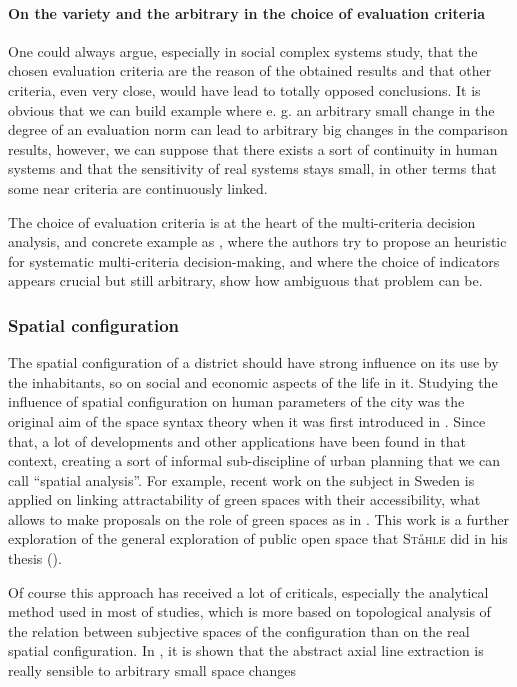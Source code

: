 \documentclass[english]{article}
\newcommand{\noun}[1]{\textsc{#1}}
\begin{document}
\paragraph{On the variety and the arbitrary in the choice of evaluation criteria}

One could always argue, especially in social complex systems study,
that the chosen evaluation criteria are the reason of the obtained
results and that other criteria, even very close, would have lead
to totally opposed conclusions. It is obvious that we can build example
where e. g. an arbitrary small change in the degree of an evaluation
norm can lead to arbitrary big changes in the comparison results,
however, we can suppose that there exists a sort of continuity in
human systems and that the sensitivity of real systems stays small,
in other terms that some near criteria are continuously linked.

\bigskip{}


The choice of evaluation criteria is at the heart of the multi-criteria
decision analysis, and concrete example as \cite{zietsman2006transportation},
where the authors try to propose an heuristic for systematic multi-criteria
decision-making, and where the choice of indicators appears crucial
but still arbitrary, show how ambiguous that problem can be.


\subsubsection{Spatial configuration}

The spatial configuration of a district should have strong influence
on its use by the inhabitants, so on social and economic aspects of
the life in it. Studying the influence of spatial configuration on
human parameters of the city was the original aim of the space syntax
theory when it was first introduced in \cite{hillier1976space}. Since
that, a lot of developments and other applications have been found
in that context, creating a sort of informal sub-discipline of urban
planning that we can call ``spatial analysis''. For example, recent
work on the subject in Sweden is applied on linking attractability
of green spaces with their accessibility, what allows to make proposals
on the role of green spaces as in \cite{staahle2010more}. This work
is a further exploration of the general exploration of public open
space that \noun{St}{\aa}\noun{hle} did in his thesis (\cite{staahle2008compact}).\bigskip{}


Of course this approach has received a lot of criticals, especially
the analytical method used in most of studies, which is more based
on topological analysis of the relation between subjective spaces
of the configuration than on the real spatial configuration. In \cite{ratti2004urban},
it is shown that the abstract axial line extraction is really sensible
to arbitrary small space changes
\end{document}
